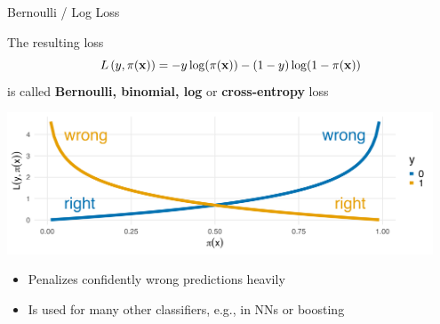\documentclass[11pt,compress,t,notes=noshow, xcolor=table]{beamer}
\begin{document}
\begin{vbframe}{Bernoulli / Log Loss}

The resulting loss 
$$L\left(y, \pi(\mathbf{x})\right) = -y\log(\pi(\mathbf{x}))-(1-y)\log(1-\pi(\mathbf{x}))$$ 
is called \textbf{Bernoulli, binomial, log} or \textbf{cross-entropy} loss

\lz

{\centering \includegraphics[width=0.95\textwidth]{figure/log_loss.png}
}

\lz

\begin{itemize}
  \item Penalizes confidently wrong predictions heavily
  \item Is used for many other classifiers, e.g., in NNs or boosting 


  
\end{itemize}


\end{vbframe}
\end{document}

